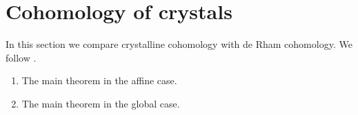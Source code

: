 \section{Cohomology of crystals}
\label{section-cohomology}

\noindent
In this section we compare crystalline cohomology with de Rham
cohomology. We follow \cite{Bhatt}.

\begin{enumerate}
\item The main theorem in the affine case.
\item The main theorem in the global case.
\end{enumerate}













